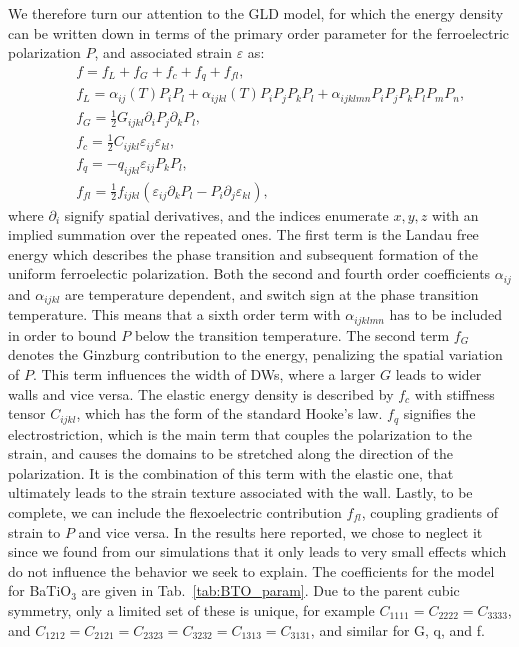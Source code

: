 We therefore turn our attention to the GLD model, for which the energy density can be written down in terms of the primary order parameter for the ferroelectric polarization $P$, and associated strain $\varepsilon$ as:
\begin{eqnarray}\label{eq:BTO_energy}
&&f = f_{L}+f_{G}+f_{c}+f_{q}+f_{fl},\\
&&f_{L} = \alpha_{ij}(T)P_iP_l + \alpha_{ijkl}(T)P_{i}P_{j}P_{k}P_{l} + \alpha_{ijklmn} P_i P_j P_k P_l P_m P_n,\\
&&f_{G} = \frac{1}{2}G_{ijkl}\partial_i P_j\partial_k P_l,\\
&&f_{c} = \frac{1}{2}C_{ijkl}\varepsilon_{ij}\varepsilon_{kl},\\
&&f_{q}= - q_{ijkl}\varepsilon_{ij}P_{k}P_{l},\label{eq:qpp}\\
&&f_{fl}=\frac{1}{2}f_{ijkl}(\varepsilon_{ij}\partial_k P_l - P_i\partial_j\varepsilon_{kl}),
\end{eqnarray}
where $\partial_i$ signify spatial derivatives, and the indices enumerate ${x,y,z}$ with an implied summation over the repeated ones.
The first term is the Landau free energy which describes the phase transition and subsequent formation of the uniform ferroelectic polarization.
Both the second and fourth order coefficients $\alpha_{ij}$ and $\alpha_{ijkl}$ are temperature dependent, and switch sign at the phase transition temperature.
This means that a sixth order term with $\alpha_{ijklmn}$ has to be included in order to bound $P$ below the transition temperature.
The second term $f_G$ denotes the Ginzburg contribution to the energy, penalizing the spatial variation of $P$.  
This term influences the width of DWs, where a larger $G$ leads to wider walls and vice versa.
The elastic energy density is described by $f_c$ with stiffness tensor $C_{ijkl}$, which has the form of the standard Hooke's law.
$f_q$ signifies the electrostriction, which is the main term that couples the polarization to the strain, and causes the domains to be stretched along the direction of the polarization.
It is the combination of this term with the elastic one, that ultimately leads to the strain texture associated with the wall.
Lastly, to be complete, we can include the flexoelectric contribution $f_{fl}$, coupling gradients of strain to $P$ and vice versa.
In the results here reported, we chose to neglect it since we found from our simulations that it only leads to very small effects which do not influence the behavior we seek to explain.
The coefficients for the model for BaTiO$_3$ are given in Tab.~\ref{tab:BTO_param}.
Due to the parent cubic symmetry, only a limited set of these is unique, for example $C_{1111} = C_{2222} = C_{3333}$, and $C_{1212} = C_{2121} = C_{2323} = C_{3232} = C_{1313} = C_{3131}$, and similar for G, q, and f. 

